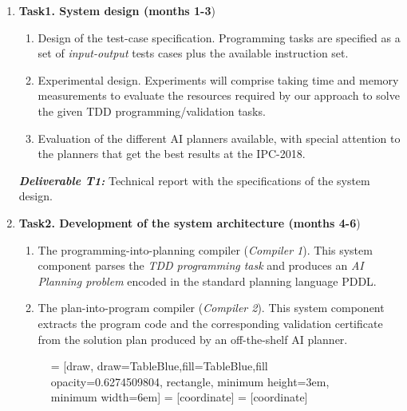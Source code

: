 \documentclass[10pt,a4paper]{paper}
\begin{document}
\begin{enumerate}
\item {\bf Task1. System design (months 1-3})
  \begin{small}
    \begin{enumerate}
    \item Design of the test-case specification. Programming tasks are specified as a set of {\em input-output} tests cases plus the available instruction set. 
    \item Experimental design. Experiments will comprise taking time and memory measurements to evaluate the resources required by our approach to solve the given TDD programming/validation tasks.
    \item Evaluation of the different AI planners available, with special attention to the planners that get the best results at the IPC-2018. 
      \end{enumerate}
  \end{small}

{\small{\bf\em  Deliverable T1:} Technical report with the specifications of the system design.}
  
  \item {\bf Task2. Development of the system architecture (months 4-6})
    \begin{small}
      \begin{enumerate}
      \item The programming-into-planning compiler ({\em Compiler 1}). This system component parses the {\em TDD programming task} and produces an {\em AI Planning problem} encoded in the standard planning language PDDL.
      \item The plan-into-program compiler ({\em Compiler 2}). This system component extracts the program code and the corresponding validation certificate from the solution plan produced by an off-the-shelf AI planner.
      \end{enumerate}
\end{small}      

\begin{figure}[hbt!]
 = [draw, draw=TableBlue,fill=TableBlue,fill opacity=0.6274509804, rectangle, minimum height=3em, minimum width=6em]
 = [coordinate]
 = [coordinate]
\begin{center}
\end{center}
\end{figure}
\end{enumerate}
\end{document}
